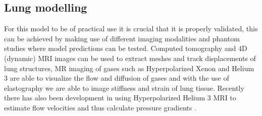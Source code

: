 




\subsection{Lung modelling}
For this model to be of practical use it is crucial that it is properly validated, this can be achieved by making use of different imaging modalities and phantom studies where model predictions can be tested. Computed tomography and 4D (dynamic) MRI images can be used to extract meshes and track displacements of lung structures, MR imaging of gases such as Hyperpolarized Xenon \citep{kaushikdiffusion} and Helium 3 are able to visualize the flow and diffusion of gases and with the use of elastography we are able to image stiffness and strain of lung tissue. Recently there has also been development in using Hyperpolarized Helium 3 MRI to estimate flow velocities and thus calculate pressure gradients \citep{patz2007hyperpolarized}.   


